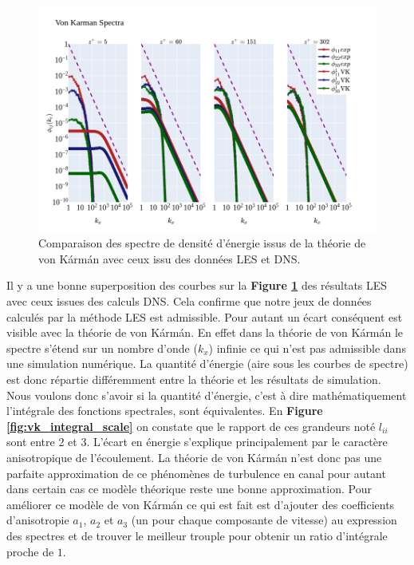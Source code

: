 \documentclass[12pt]{article}   %
\theoremstyle{plain}
\theoremstyle{remark}
\begin{document}
\begin{figure}[H]
	\begin{center}
		\includegraphics[width=0.9\linewidth]{../../output/figures/channel_wrles_retau395/split_time/von_karman/von_karman_spectra_.png}
		\caption{Comparaison des spectre de densité d'énergie issus de la théorie de von Kármán avec ceux issu des données LES et DNS.}
		\label{fig:vk_spectra}
	\end{center}
\end{figure}

Il y a une bonne superposition des courbes sur la \textbf{Figure \ref{fig:vk_spectra}} des résultats LES avec ceux issues des calculs DNS. Cela confirme que notre jeux de données calculés par la méthode LES est admissible. Pour autant un écart conséquent est visible avec la théorie de von Kármán. En effet dans la théorie de von Kármán le spectre s'étend sur un nombre d'onde ($k_x$) infinie ce qui n'est pas admissible dans une simulation numérique. La quantité d'énergie (aire sous les courbes de spectre) est donc répartie différemment entre la théorie et les résultats de simulation. Nous voulons donc s'avoir si la quantité d'énergie, c'est à dire mathématiquement l'intégrale des fonctions spectrales, sont équivalentes. En {\bf Figure \ref{fig:vk_integral_scale}} on constate que le rapport de ces grandeurs noté $l_{ii}$ sont entre 2 et 3. L'écart en énergie s'explique principalement par le caractère anisotropique de l'écoulement. La théorie de von Kármán n'est donc pas une parfaite approximation de ce phénomènes de turbulence en canal pour autant dans certain cas ce modèle théorique reste une bonne approximation. Pour améliorer ce modèle de von Kármán ce qui est fait est d'ajouter des coefficients d'anisotropie $a_1$, $a_2$ et $a_3$ (un pour chaque composante de vitesse) au expression des spectres et de trouver le meilleur trouple pour obtenir un ratio d'intégrale proche de $1$.
	
\end{document}
